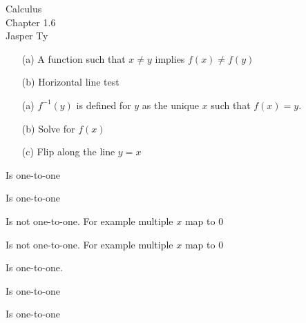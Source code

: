 \documentclass{article}
\begin{document}
\begin{mytitle}
    Calculus \\
    Chapter 1.6 \\
    \normalsize Jasper Ty
\end{mytitle}

\begin{Answer}
    \begin{itemize}
        \item[(a)]
            A function such that $x \neq y$ implies $f(x) \neq f(y)$
        \item[(b)]
            Horizontal line test
    \end{itemize}
\end{Answer}

\begin{Answer}
    \begin{itemize}
        \item[(a)]
            $f^{-1}(y)$ is defined for $y$ as the unique $x$ such that $f(x) = y$.
        \item[(b)]
            Solve for $f(x)$
        \item[(c)]
            Flip along the line $y = x$
    \end{itemize}
\end{Answer}

\begin{Answer}
    Is one-to-one
\end{Answer}

\begin{Answer}
    Is one-to-one
\end{Answer}

\begin{Answer}
    Is not one-to-one. For example multiple $x$ map to $0$
\end{Answer}

\begin{Answer}
    Is not one-to-one. For example multiple $x$ map to $0$
\end{Answer}

\begin{Answer}
    Is one-to-one. 
\end{Answer}

\begin{Answer}
    Is one-to-one
\end{Answer}

\begin{Answer}
    Is one-to-one
\end{Answer}
\end{document}
